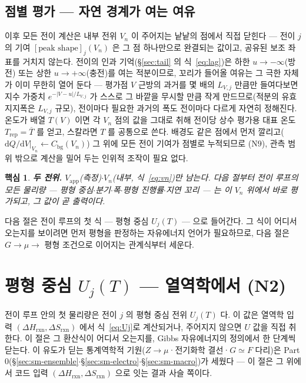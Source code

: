 \documentclass[11pt,a4paper]{article}
\newtheorem*{keybox}{핵심}
\newcommand{\dd}{\mathrm{d}}
\newcommand{\app}{\mathrm{app}}
\newcommand{\bg}{\mathrm{bg}}
\newcommand{\rxn}{\mathrm{rxn}}
\newcommand{\rep}{\mathrm{rep}}
\begin{document}
\subsection{점별 평가 --- 자연 경계가 여는 여유}
이후 모든 전이 계산은 내부 전위 $V_n$ 이 주어지는 낱낱의 점에서 직접 닫힌다 --- 전이 $j$ 의 기여
$[\text{peak shape}]_j(V_n)$ 은 그 점 하나만으로 완결되는 값이고, 공유된 보조 좌표를 거치지 않는다.
전이의 인과 기억(\S\ref{sec:tail} 의 식~\eqref{eq:lag})은 하한 $u\to-\infty$(방전) 또는 상한
$u\to+\infty$(충전)를 여는 적분이므로, 꼬리가 들어올 여유는 그 극한 자체가 이미 무한히 열어 둔다 ---
평가점 $V$ 근방의 과거를 몇 배의 $L_{V,j}$ 만큼만 들여다보면 지수 가중치 $e^{-|V-u|/L_{V,j}}$ 가 스스로
그 바깥을 무시할 만큼 작게 만드므로(적분의 유효 지지폭은 $L_{V,j}$ 규모), 전이마다 필요한 과거의 폭도
전이마다 다르게 자연히 정해진다. 온도가 배열 $T(V)$ 이면 각 $V_n$ 점의 값을 그대로 취해 전이당 상수
평가용 대표 온도 $T_\rep=\overline{T}$ 를 얻고, 스칼라면 $T$ 를 공통으로 쓴다. 배경도 같은 점에서
먼저 깔리고($\dd Q/\dd V|_{V_n}\leftarrow C_\bg(V_n)$) 그 위에 모든 전이 기여가 점별로 누적되므로
($\mathrm N9$), 관측 범위 밖으로 계산을 밀어 두는 인위적 조작이 필요 없다.

\begin{keybox}
\textbf{두 전위.} $V_\app$(측정)$\cdot$$V_n$(내부, 식~\eqref{eq:vn})만 남는다. 다음 절부터 전이 루프의 모든
물리량 --- 평형 중심$\cdot$분기$\cdot$폭$\cdot$평형 진행률$\cdot$지연 꼬리 --- 는 이 $V_n$ 위에서 바로
평가되고, 그 값이 곧 출력이다.
\end{keybox}

다음 절은 전이 루프의 첫 식 — 평형 중심 $U_j(T)$ — 으로 들어간다. 그 식이 어디서 오는지를 보이려면 먼저 평형을
판정하는 자유에너지 언어가 필요하므로, 다음 절은 $G\to\mu\to$ 평형 조건으로 이어지는 관계식부터 세운다.

\section{평형 중심 $U_j(T)$ — 열역학에서 (N2)}\label{sec:center}
전이 루프 안의 첫 물리량은 전이 $j$ 의 평형 중심 전위 $U_j(T)$ 다. 이 값은 열역학 입력 $(\Delta H_\rxn,\Delta S_\rxn)$
에서 식~\eqref{eq:Uj}로 계산되거나, 주어지지 않으면 $U$ 값을 직접 취한다. 이 절은 그 환산식이 어디서 오는지를, Gibbs
자유에너지의 정의에서 한 단계씩 닫는다. 이 유도가 딛는 통계역학적 기원($Z\to\mu$·전기화학 결선·$G\simeq F$ 다리)은
Part 0(\S\ref{sec:sm-ensemble}$\cdot$\S\ref{sec:sm-electro}$\cdot$\S\ref{sec:sm-macro})가 세웠다 — 이 절은 그 위에서 코드 입력
$(\Delta H_\rxn,\Delta S_\rxn)$ 으로 잇는 결과 사슬 쪽이다.
\end{document}
